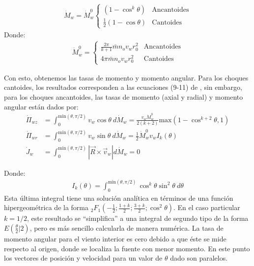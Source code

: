 \begin{align}
  \dot{M}_w = \dot{M}^0_w\left\lbrace
  \begin{array}{lr}
    \left(1 - \cos^k\theta\right) & \mathrm{Ancantoides} \\
    \frac{1}{2} \left(1 - \cos\theta\right) & \mathrm{Cantoides}
  \end{array}\right. \label{eq:inner-dot-M}
\end{align}
Donde:
\begin{align}
  \dot{M}^0_w = \left\lbrace
  \begin{array}{lr}
    \frac{2\pi}{k+1}\bar{m}n_o v_w r_0^2 & \mathrm{Ancantoides} \\
    4\pi \bar{m}n_o v_w r_0^2 & \mathrm{Cantoides}
  \end{array}\right.
\end{align}

Con esto, obtenemos las tasas de momento y momento angular. Para los choques cantoides, los resultados corresponden a las ecuaciones (9-11) de \CRW{}, sin embargo, para los choques ancantoides, las tasas de momento (axial y radial) y momento angular están dados por:
\begin{align}
  \dot{\Pi}_{wz} &= \int^{\mathrm{min}(\theta, \pi/2)}_0 v_w\cos\theta~d\dot{M}_w = \frac{v_w \dot{M}^0_w}{2\left(k+2\right)}\mathrm{max}\left(1 - \cos^{k+2}\theta, 1\right) \label{eq:Pi-wz} \\
  \dot{\Pi}_{wr} &= \int^{\mathrm{min}(\theta, \pi/2)}_0 v_w\sin\theta~d\dot{M}_w = \frac{1}{2}\dot{M}^0_w v_w I_k(\theta) \\
  \dot{J}_w &= \int^{\mathrm{min}(\theta, \pi/2)}_0 |\vec{R} \times \vec{v}_w|d\dot{M}_w = 0 \label{eq:inner-dot-J}
\end{align}

Donde:
\begin{align}
  I_k(\theta) = \int^{\mathrm{min}(\theta, \pi/2)}_0 \cos^k\theta \sin^2\theta~d\theta \label{eq:Ikt}
\end{align}
 Esta última integral tiene una solución analítica en términos de una función hipergeométrica de la forma ${}_2F_1\left(-\frac{1}{2}; \frac{1+k}{2}; \frac{3+k}{2}; \cos^2\theta\right)$. En el caso particular $k=1/2$, este resultado se ``simplifica'' a una integral de segundo tipo de la forma $E\left(\frac{\theta}{2} | 2\right)$, pero es más sencillo calcularla de manera numérica. La tasa de momento angular para el viento interior es cero debido a que éste se mide respecto al origen, donde se localiza la fuente con menor momento. En este punto los vectores de posición y velocidad para un valor de $\theta$ dado son paralelos.

